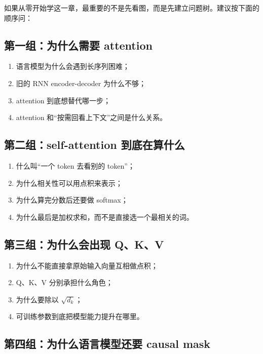 \documentclass[12pt,a4paper]{ctexart}
\begin{document}
如果从零开始学这一章，最重要的不是先看图，而是先建立问题树。建议按下面的顺序问：

\subsection{第一组：为什么需要 attention}

\begin{enumerate}[leftmargin=2em]
  \item 语言模型为什么会遇到长序列困难；
  \item 旧的 RNN encoder-decoder 为什么不够；
  \item attention 到底想替代哪一步；
  \item attention 和``按需回看上下文''之间是什么关系。
\end{enumerate}

\subsection{第二组：self-attention 到底在算什么}

\begin{enumerate}[leftmargin=2em]
  \item 什么叫``一个 token 去看别的 token''；
  \item 为什么相关性可以用点积来表示；
  \item 为什么算完分数后还要做 softmax；
  \item 为什么最后是加权求和，而不是直接选一个最相关的词。
\end{enumerate}

\subsection{第三组：为什么会出现 Q、K、V}

\begin{enumerate}[leftmargin=2em]
  \item 为什么不能直接拿原始输入向量互相做点积；
  \item Q、K、V 分别承担什么角色；
  \item 为什么要除以 \(\sqrt{d_k}\)；
  \item 可训练参数到底把模型能力提升在哪里。
\end{enumerate}

\subsection{第四组：为什么语言模型还要 causal mask}
\end{document}
